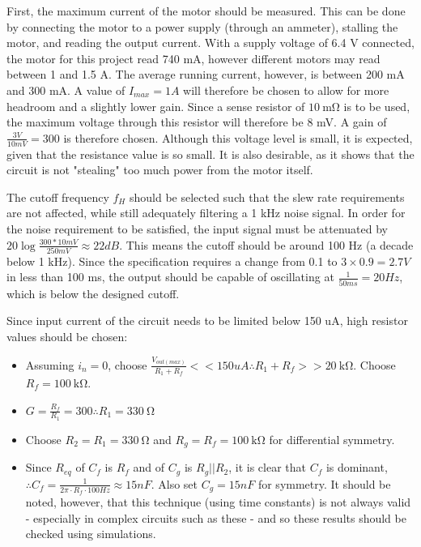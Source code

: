 First, the maximum current of the motor should be measured. This can be done by connecting the motor to a power supply (through an ammeter), stalling the motor, and reading the output current.
With a supply voltage of 6.4 V connected, the motor for this project read 740 mA, however different motors may read between 1 and 1.5 A. The average running current, however, is between 200 mA
and 300 mA. A value of $I_{max} = 1 A$ will therefore be chosen to allow for more headroom and a slightly lower gain.
Since a sense resistor of $\SI{10}{\milli\ohm}$ is to be used, the maximum voltage through this resistor will therefore be 8 mV. A gain of $\frac{3 V}{10 mV} = 300$ is therefore chosen.
Although this voltage level is small, it is expected, given that the resistance value is so small. It is also desirable, as it shows that the circuit is not "stealing" too much power from the motor itself.

The cutoff frequency $f_H$ should be selected such that the slew rate requirements are not affected, while still adequately filtering a 1 kHz noise signal. In order for the noise requirement
to be satisfied, the input signal must be attenuated by $20 \log{\frac{300 * 10 mV}{250 mV}} \approx 22 dB$. This means the cutoff should be around 100 Hz (a decade below 1 kHz).
Since the specification requires a change from 0.1 to $3 \times 0.9 = 2.7 V$ in less than 100 ms, the output should be capable of oscillating at $\frac{1}{50 ms} = 20 Hz$, which is below the designed cutoff.

Since input current of the circuit needs to be limited below 150 uA, high resistor values should be chosen:
\begin{itemize}
  \item Assuming $i_n = 0$, choose $\frac{V_{out(max)}}{R_1 + R_f} << 150 uA \therefore R_1 + R_f >> \SI{20}{\kilo\ohm}$. Choose $R_f = \SI{100}{\kilo\ohm}$.
  \item $G = \frac{R_f}{R_1} = 300 \therefore R_1 = \SI{330}{\ohm}$
  \item Choose $R_2 = R_1 = \SI{330}{\ohm}$ and $R_g = R_f = \SI{100}{\kilo\ohm}$ for differential symmetry.
  \item Since $R_{eq}$ of $C_f$ is $R_f$ and of $C_g$ is $R_g || R_2$, it is clear that $C_f$ is dominant, $\therefore C_f = \frac{1}{2 \pi \cdot R_f \cdot 100 Hz} \approx 15 nF$. Also set $C_g = 15nF$ for symmetry.
        It should be noted, however, that this technique (using time constants) is not always valid - especially in complex circuits such as these - and so these results should be checked using simulations.
\end{itemize}

